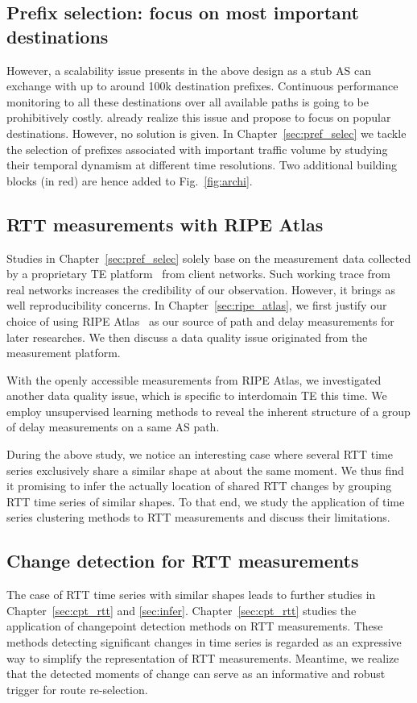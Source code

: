 \subsection{Prefix selection: focus on most important destinations}
However, a scalability issue presents in the above design as a stub AS can exchange with up to around 100k destination prefixes.
Continuous performance monitoring to all these destinations over all available paths is going to be prohibitively costly.
\citet{Feamster2003} already realize this issue and propose to focus on popular destinations.
However, no solution is given.
In Chapter~\ref{sec:pref_selec} we tackle the selection of prefixes associated with important traffic volume by studying their temporal dynamism at different time resolutions. Two additional building blocks (in red) are hence added to Fig.~\ref{fig:archi}.

\subsection{RTT measurements with RIPE Atlas}
Studies in Chapter~\ref{sec:pref_selec} solely base on the measurement data collected by a proprietary TE platform~\cite{b6} from client networks. Such working trace from real networks increases the credibility of our observation. However, it brings as well reproducibility concerns.
In Chapter~\ref{sec:ripe_atlas}, we first justify our choice of using RIPE Atlas~\cite{atlas} as our source of path and delay measurements for later researches.
We then discuss a data quality issue originated from the measurement platform.

With the openly accessible measurements from RIPE Atlas, we investigated another data quality issue, which is specific to interdomain TE this time. We employ unsupervised learning methods to reveal the inherent structure of a group of delay measurements on a same AS path.

During the above study, we notice an interesting case where several RTT time series exclusively share a similar shape at about the same moment.
We thus find it promising to infer the actually location of shared RTT changes by grouping RTT time series of similar shapes. To that end, we study the application of time series clustering methods to RTT measurements and discuss their limitations.

\subsection{Change detection for RTT measurements}
The case of RTT time series with similar shapes leads to further studies in Chapter~\ref{sec:cpt_rtt} and \ref{sec:infer}. Chapter~\ref{sec:cpt_rtt} studies the application of changepoint detection methods on RTT measurements. These methods detecting significant changes in time series is regarded as an expressive way to simplify the representation of RTT measurements. Meantime, we realize that the detected moments of change can serve as an informative and robust trigger for route re-selection.

